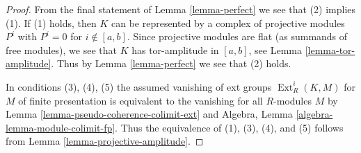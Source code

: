 \documentclass[10pt,a4paper]{amsart}
\theoremstyle{plain}
\theoremstyle{definition}
\theoremstyle{remark}
\numberwithin{equation}{subsection}
\def\Ext{\mathop{\mathrm{Ext}}\nolimits}
\begin{document}
\begin{proof}
From the final statement of Lemma \ref{lemma-perfect} we see that
(2) implies (1).  If (1) holds, then $K$ can be represented by
a complex of projective modules $P^i$ with $P^i = 0$ for $i \not \in [a, b]$.
Since projective modules are flat (as summands of free modules), we see
that $K$ has tor-amplitude in $[a, b]$, see Lemma \ref{lemma-tor-amplitude}.
Thus by Lemma \ref{lemma-perfect} we see that (2) holds.

\medskip\noindent
In conditions (3), (4), (5) the assumed vanishing of ext groups
$\Ext^i_R(K, M)$ for $M$ of finite presentation is equivalent to the
vanishing for all $R$-modules $M$ by
Lemma \ref{lemma-pseudo-coherence-colimit-ext}
and Algebra, Lemma \ref{algebra-lemma-module-colimit-fp}.
Thus the equivalence of (1), (3), (4), and (5)
follows from Lemma \ref{lemma-projective-amplitude}.
\end{proof}
\end{document}
